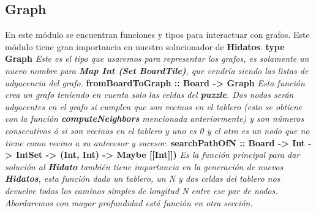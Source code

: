 \documentclass[12pt]{article}
\begin{document}
\subsection{Graph}
En este m\'odulo se encuentran funciones y tipos para interactuar con grafos. Este m\'odulo tiene gran importancia en nuestro solucionador de {\bf Hidatos}.
\newline \newline
{\bf type Graph}\newline
{\it Este es el tipo que usaremos para representar los grafos, es solamente un nuevo nombre para {\bf Map Int (Set BoardTile)}, que vendr\'ia siendo las listas de adyacencia del grafo.}
\newline \newline
{\bf fromBoardToGraph :: Board -> Graph}\newline
{\it Esta funci\'on crea un grafo teniendo en cuenta solo las celdas del {\bf puzzle}. Dos nodos ser\'an adyacentes en el grafo si cumplen que son vecinos en el tablero (esto se obtiene con la funci\'on
{\bf computeNeighbors} mencionada anteriormente) y son n\'umeros consecutivos \'o si son vecinos en el tablero y uno es 0 y el otro es un nodo que no tiene como vecino a su antecesor y sucesor.}
\newline \newline
{\bf searchPathOfN :: Board -> Int -> IntSet -> (Int, Int) -> Maybe [[Int]])}\newline
{\it Es la funci\'on principal para dar soluci\'on al {\bf Hidato} tambi\'en tiene importancia en la generaci\'on de nuevos {\bf Hidatos}, esta funci\'on dado un tablero, un N y dos celdas del tablero nos devuelve todos los caminos simples
de longitud N entre ese par de nodos. Abordaremos con mayor profundidad est\'a funci\'on en otra secci\'on.}
\newline \newline
\end{document}
